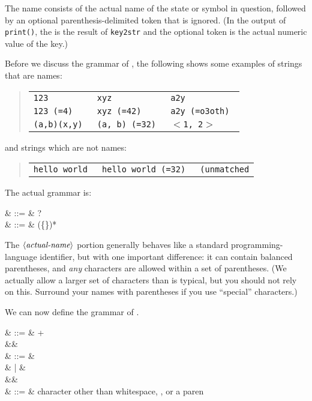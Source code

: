 The name consists of the actual name of the state or symbol
in question, followed by an optional parenthesis-delimited token that
is ignored. (In the output of \texttt{print()}, the  is the result of
\texttt{key2str} and the optional token is the actual numeric value of
the key.)

Before we discuss the grammar of , the following shows
some examples of strings that are names:
\begin{quote}
\begin{tabular}{p{1.5in}p{1.5in}p{1.5in}}
  \tt 123         & \tt xyz          & \tt a2y          \\
  \tt 123 (=4)    & \tt xyz (=42)    & \tt a2y (=o3oth) \\
  \tt (a,b)(x,y)  & \tt (a, b) (=32) & \tt $<$1, 2$>$
\end{tabular}
\end{quote}
and strings which are not names:
\begin{quote}
\begin{tabular}{p{1.5in}p{1.5in}p{1.5in}}
  \tt hello world & \tt hello world (=32)  & \tt (unmatched
\end{tabular}
\end{quote}

The actual grammar is:
\begin{grammar}
   & ::= &  \cfgsp  {}? \\
   & ::= & \term{(}\cfgsp(\neg\{\term{(}\})*\cfgsp\term{)}
\end{grammar}

The $\langle\textit{actual-name}\rangle$ portion generally behaves like a standard
programming-language identifier, but with one important difference: it can
contain
balanced parentheses, and \emph{any} characters are allowed within a
set of parentheses. (We actually allow a larger set of characters than
is typical, but you should not rely on this. Surround your names
with parentheses if you use ``special'' characters.)

We can now define the grammar of .

\begin{grammar}
   & ::= &  + \\
&& \\
   & ::= &   \\
                 &   | &   \\
&& \\
  & ::= &  \textrm{character other than whitespace, \term{,}, or a paren}
\end{grammar}

